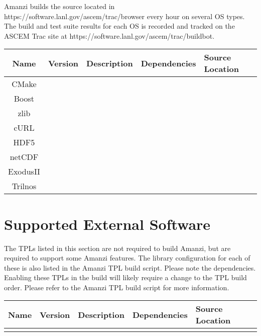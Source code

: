 \documentclass[12pt]{article}
\begin{document}
Amanzi builds the source located in https://software.lanl.gov/ascem/trac/browser every hour on several OS types.
The build and test suite results for each OS is recorded and tracked on the ASCEM Trac
site at https://software.lanl.gov/ascem/trac/buildbot. 

\begin{table}[htdp]
\begin{center}
\begin{tabular}{|c|c|p{3cm}|p{3cm}|p{3cm}|}
\hline
\hline
Name & Version & Description & Dependencies & Source Location \\
\hline
CMake &&&& \\
\hline
Boost &&&& \\
\hline
zlib &&&& \\
\hline
cURL &&&& \\
\hline
HDF5 &&&& \\
\hline
netCDF &&&& \\
\hline
ExodusII &&&& \\
\hline
Trilnos &&&& \\
\hline
\hline
\end{tabular}
\end{center}
\label{default}
\end{table}%


\section*{Supported External Software}
The TPLs listed in this section are not required to build Amanzi, but are required to support some Amanzi features. The 
library configuration for each of these is also listed in the Amanzi TPL build script. Please note the dependencies. Enabling
these TPLs in the build will likely require a change to the TPL build order. Please refer to the Amanzi TPL build script for
more information.

\begin{table}[htdp]
\begin{center}
\begin{tabular}{|c|c|p{3cm}|p{3cm}|p{3cm}|}
\hline
\hline
Name & Version & Description & Dependencies & Source Location \\
\hline
&&&& \\
\hline


\end{tabular}
\end{center}
\label{default}
\end{table}%
\end{document}

